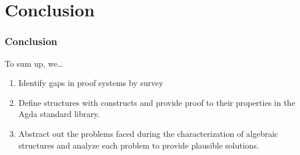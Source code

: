 \documentclass[xcolor={dvipsnames}]{beamer}
\begin{document}

\section{Conclusion}

\begin{frame}
  \frametitle{Conclusion}

  To sum up, we\ldots{}
  \begin{enumerate}
    \item Identify gaps in proof systems by survey
    \item Define structures with constructs and provide proof to their
    properties in the Agda standard library.
    \item Abstract out the problems faced during the characterization of
    algebraic structures and analyze each problem to provide plausible
    solutions.
  \end{enumerate}
\end{frame}
\end{document}
